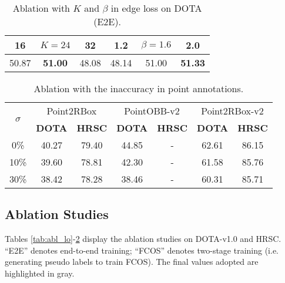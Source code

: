 \begin{table}[!tb]
\fontsize{8.5pt}{10pt}\selectfont
\setlength{\tabcolsep}{2.85mm}
\setlength{\aboverulesep}{0.4ex}
\setlength{\belowrulesep}{0.4ex}
\setlength{\abovecaptionskip}{1.5mm}
\centering
\begin{tabular}{c|c|c||c|c|c}
\toprule
16 & \cellcolor{gray!20}$K\!=\!24$ & 32 & 1.2 & \cellcolor{gray!20}$\beta\!=\!1.6$ & 2.0 \\ \midrule
50.87 & \cellcolor{gray!20}\textbf{51.00} & 48.08 & 48.14 & \cellcolor{gray!20}51.00 & \textbf{51.33} \\
\bottomrule
\end{tabular}
\caption{Ablation with $K$ and $\beta$ in edge loss on DOTA (E2E).}
\label{tab:abl_edgeparam}
\vspace{-4pt}
\end{table}

\begin{table}[!tb]
\fontsize{8.5pt}{10pt}\selectfont
\setlength{\tabcolsep}{1.75mm}
\setlength{\aboverulesep}{0.4ex}
\setlength{\belowrulesep}{0.4ex}
\setlength{\abovecaptionskip}{1.5mm}
\centering
\begin{tabular}{c|cc|cc|cc}
\toprule
\multirow{2}{*}{$\sigma$} & \multicolumn{2}{c|}{Point2RBox} & \multicolumn{2}{c|}{PointOBB-v2} & \multicolumn{2}{c}{Point2RBox-v2} \\
 & {\textbf{DOTA}} & {\textbf{HRSC}} & {\textbf{DOTA}} & {\textbf{HRSC}} & {\textbf{DOTA}} & {\textbf{HRSC}} \\ \midrule
0\%  & 40.27 & 79.40 & 44.85 & - & 62.61 & 86.15 \\
10\% & 39.60 & 78.81 & 42.30 & - & 61.58 & 85.76 \\
30\% & 38.42 & 78.28 & 38.46 & - & 60.31 & 85.71 \\
\bottomrule
\end{tabular}
\caption{Ablation with the inaccuracy in point annotations.}
\label{tab:abl_noise}
\vspace{-10pt}
\end{table}

\subsection{Ablation Studies}
\label{sec:experiment-ablation}

Tables \ref{tab:abl_lo}-\ref{tab:abl_noise} display the ablation studies on DOTA-v1.0 and HRSC. ``E2E'' denotes end-to-end training; ``FCOS'' denotes two-stage training (i.e. generating pseudo labels to train FCOS). The final values adopted are highlighted in gray.

